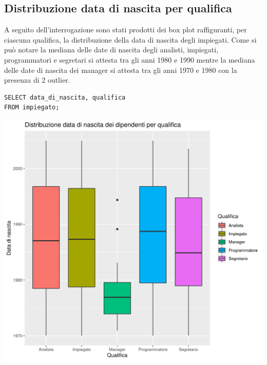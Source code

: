\documentclass{article}
\begin{document}
\newpage

\subsection{Distribuzione data di nascita per qualifica}
A seguito dell'interrogazione sono stati prodotti dei box plot raffiguranti, per ciascuna qualifica, la distribuzione della data di nascita degli impiegati.
\newline
Come si può notare la mediana delle date di nascita degli analisti, impiegati, programmatori e segretari si attesta tra gli anni 1980 e 1990 mentre la mediana delle date di nascita dei manager si attesta tra gli anni 1970 e 1980 con la presenza di 2 outlier.
\begin{verbatim}
SELECT data_di_nascita, qualifica 
FROM impiegato;
\end{verbatim}
\begin{center}
\includegraphics[width=\textwidth]{plot_dist_dNascita_qualifica.png}
\end{center}

\newpage
\end{document}
